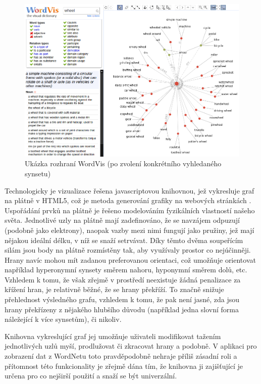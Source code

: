 \documentclass[a4paper, 11pt, oneside]{book}
\begin{document}
					\begin{figure}[h]
						\centering
						\includegraphics[width=1.0\textwidth]{wordvis.png}
						\caption{Ukázka rozhraní WordVis (po zvolení konkrétního vyhledaného synsetu)}
						\label{fig:wordvis}
					\end{figure}

					Technologicky je vizualizace řešena javascriptovou knihovnou, jež vykresluje graf na plátně v HTML5, což je metoda generování grafiky na webových stránkách \parencite{w3schools2017htmlcanvas}. Uspořádání prvků na plátně je řešeno modelováním fyzikálních vlastností našeho světa. Jednotlivé uzly na plátně mají zadefinováno, že se navzájem odpuzují (podobně jako elektrony), naopak vazby mezi nimi fungují jako pružiny, jež mají nějakou ideální délku, v níž se snaží setrvávat. Díky těmto dvěma soupeřícím silám jsou body na plátně rozmístěny tak, aby využívaly prostor co nejúčinněji. Hrany navíc mohou mít zadanou preferovanou orientaci, což umožňuje orientovat například hyperonymní synsety směrem nahoru, hyponymní směrem dolů, etc. \parencite{wordvis2010vercruysse} Vzhledem k tomu, že však zřejmě v prostředí neexistuje žádná penalizace za křížení hran, je relativně běžné, že se hrany překříží. To značně snižuje přehlednost výsledného grafu, vzhledem k tomu, že pak není jasné, zda jsou hrany překřízeny z nějakého hlubšího důvodu (například jedna slovní forma náležející k více synsetům), či nikoliv. 

					Knihovna vykreslující graf jej umožňuje uživateli modifikovat tažením jednotlivých uzlů myší, prodlužovat či zkracovat hrany a podobně. V aplikaci pro zobrazení dat z WordNetu toto pravděpodobně nehraje příliš zásadní roli a přítomnost této funkcionality je zřejmě dána tím, že knihovna ji zajišťující je určena pro co nejširší použití a snaží se být univerzální. \parencite{wordvis2010vercruysse}
\end{document}

